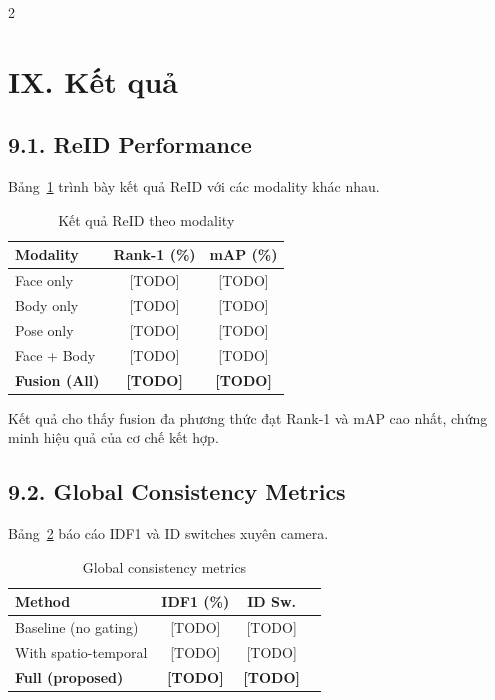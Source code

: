 \documentclass[a4paper,13pt]{article}
\begin{document}
\begin{multicols}{2}
\section*{IX. Kết quả}

\subsection*{9.1. ReID Performance}

Bảng~\ref{tab:reid_results} trình bày kết quả ReID với các modality khác nhau.

\begin{table}[H]
\centering
\caption{Kết quả ReID theo modality}
\label{tab:reid_results}
\fontsize{11}{13}\selectfont
\renewcommand{\arraystretch}{1.3}
\begin{tabular}{lcc}
\toprule
\textbf{Modality} & \textbf{Rank-1 (\%)} & \textbf{mAP (\%)} \\
\midrule
Face only & [TODO] & [TODO] \\
Body only & [TODO] & [TODO] \\
Pose only & [TODO] & [TODO] \\
Face + Body & [TODO] & [TODO] \\
\textbf{Fusion (All)} & \textbf{[TODO]} & \textbf{[TODO]} \\
\bottomrule
\end{tabular}
\end{table}

Kết quả cho thấy fusion đa phương thức đạt Rank-1 và mAP cao nhất, chứng minh hiệu quả của cơ chế kết hợp.

\subsection*{9.2. Global Consistency Metrics}

Bảng~\ref{tab:global_metrics} báo cáo IDF1 và ID switches xuyên camera.

\begin{table}[H]
\centering
\caption{Global consistency metrics}
\label{tab:global_metrics}
\fontsize{11}{13}\selectfont
\renewcommand{\arraystretch}{1.3}
\begin{tabular}{lccc}
\toprule
\textbf{Method} & \textbf{IDF1 (\%)} & \textbf{ID Sw.}  \\
\midrule
Baseline (no gating) & [TODO] & [TODO] \\
With spatio-temporal & [TODO] & [TODO] \\
\textbf{Full (proposed)} & \textbf{[TODO]} & \textbf{[TODO]}  \\
\bottomrule
\end{tabular}
\end{table}


\end{multicols}
\end{document}
